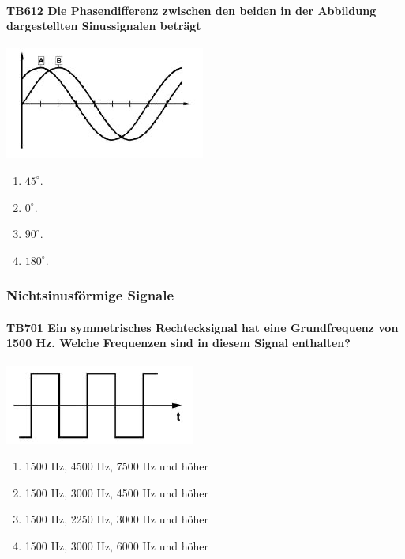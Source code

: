 \documentclass[8pt]{article}
\begin{document}
\begin{enumerate}
\paragraph*{TB612 Die Phasendifferenz zwischen den beiden in der Abbildung dargestellten Sinussignalen beträgt}
\begin{center}
	\begin{minipage}{\linewidth}
		\centering
		\includegraphics[scale=1.0]{pics/tb612_a.jpg}
	\end{minipage}
\end{center}
\begin{enumerate}[nolistsep,label=\Alph*]
\item $45^{\circ}$.
\item $0^{\circ}$.
\item $90^{\circ}$.
\item $180^{\circ}$.
\end{enumerate}

\pagebreak
\subsubsection{Nichtsinusförmige Signale}
\paragraph*{TB701 Ein symmetrisches Rechtecksignal hat eine Grundfrequenz von 1500 Hz. Welche Frequenzen sind in diesem Signal enthalten?}
\begin{center}
	\begin{minipage}{\linewidth}
		\centering
		\includegraphics[scale=1.0]{pics/tb701_a.jpg}
	\end{minipage}
\end{center}
\begin{enumerate}[nolistsep,label=\Alph*]
\item 1500 Hz, 4500 Hz, 7500 Hz und höher
\item 1500 Hz, 3000 Hz, 4500 Hz und höher
\item 1500 Hz, 2250 Hz, 3000 Hz und höher
\item 1500 Hz, 3000 Hz, 6000 Hz und höher
\end{enumerate}


\end{enumerate}
\end{document}

